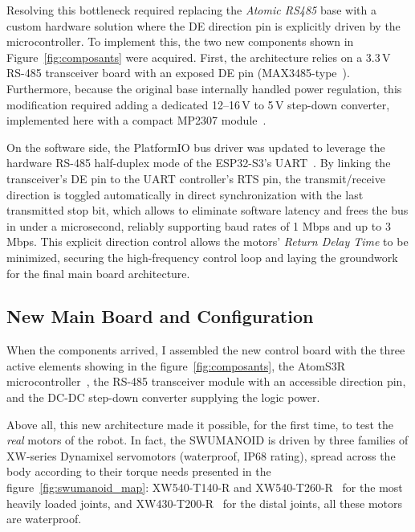 \documentclass{tropLaClasse}
\begin{document}
Resolving this bottleneck required replacing the \textit{Atomic RS485} base with a custom hardware solution where the DE direction pin is explicitly driven by the microcontroller. To implement this, the two new components shown in Figure~\ref{fig:composants} were acquired. First, the architecture relies on a 3.3\,V RS-485 transceiver board with an exposed DE pin (MAX3485-type~\cite{max3485}). Furthermore, because the original base internally handled power regulation, this modification required adding a dedicated 12–16\,V to 5\,V step-down converter, implemented here with a compact MP2307 module~\cite{mp2307}.

On the software side, the PlatformIO bus driver was updated to leverage the hardware RS-485 half-duplex mode of the ESP32-S3's UART~\cite{esp32s3_uart}. By linking the transceiver's DE pin to the UART controller's RTS pin, the transmit/receive direction is toggled automatically in direct synchronization with the last transmitted stop bit, which allows to eliminate software latency and frees the bus in under a microsecond, reliably supporting baud rates of 1 Mbps and up to 3 Mbps. This explicit direction control allows the motors' \textit{Return Delay Time} to be minimized, securing the high-frequency control loop and laying the groundwork for the final main board architecture.


\subsection{New Main Board and Configuration}

When the components arrived, I assembled the new control board with the three active elements showing in the figure~\ref{fig:composants}, the AtomS3R microcontroller~\cite{m5stack_atoms3r}, the RS-485 transceiver module with an accessible direction pin, and the DC-DC step-down converter supplying the logic power. \label{text:composants}

Above all, this new architecture made it possible, for the first time, to test the \emph{real} motors of the robot. In fact, the SWUMANOID is driven by three families of XW-series Dynamixel servomotors (waterproof, IP68 rating), spread across the body according to their torque needs presented in the figure~\ref{fig:swumanoid_map}: XW540-T140-R and XW540-T260-R~\cite{dynamixel_xw540t140,dynamixel_xw540t260} for the most heavily loaded joints, and XW430-T200-R~\cite{dynamixel_xw430t200} for the distal joints, all these motors are waterproof. \label{text:swumanoid_map}
\end{document}
